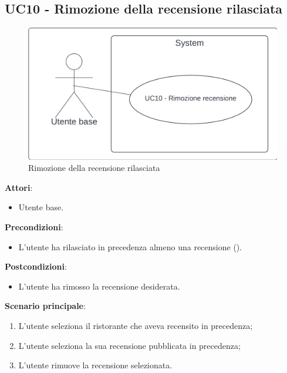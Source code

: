 \subsection{UC10 - Rimozione della recensione rilasciata} \label{usecase:10}
\begin{figure}[H]
    \centering
    \includegraphics[width=0.75\linewidth]{ucd/UCD10.png}
\caption{Rimozione della recensione rilasciata}
\end{figure}
\textbf{Attori}:
\begin{itemize}
    \item Utente base.
\end{itemize}
\textbf{Precondizioni}:
\begin{itemize}
    \item L'utente ha rilasciato in precedenza almeno una recensione ().
\end{itemize}
\textbf{Postcondizioni}:
\begin{itemize}
    \item L'utente ha rimosso la recensione desiderata.
\end{itemize}
\textbf{Scenario principale}:
\begin{enumerate}
    \item L'utente seleziona il ristorante che aveva recensito in precedenza;
    \item L'utente seleziona la sua recensione pubblicata in precedenza;
    \item L'utente rimuove la recensione selezionata.
\end{enumerate}
\newpage